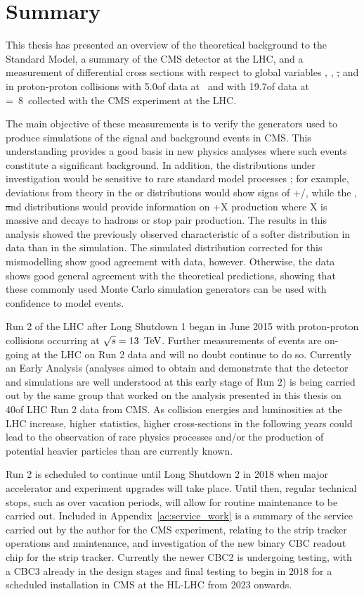 \chapter{Summary }
\label{c:summary}

This thesis has presented an overview of the theoretical background to the Standard Model, a summary of the
CMS detector at the LHC, and a measurement of differential \ttbar cross sections with respect to global
variables \met, \HT, \st, \mt and \wpt in proton-proton collisions with 5.0\fbinv of data at ~\TeV and
with 19.7\fbinv of data at \roots=~8~\TeV collected with the CMS experiment at the LHC. 

The main objective of these measurements is to verify the generators used to produce simulations of the signal
and background events in CMS. This understanding provides a good basis in new physics analyses where such
events constitute a significant background. In addition, the distributions under investigation would be
sensitive to rare standard model processes ; for example, deviations from theory in the \met or \mt
distributions would show signs of \ttbar+\Z/\W, while the \HT, \st and \wpt distributions would provide
information on \ttbar+X production where X is massive and decays to hadrons or stop pair production. The
results in this analysis showed the previously observed characteristic of a softer \pt distribution in data
than in the simulation. The simulated distribution corrected for this mismodelling show good agreement with
data, however. Otherwise, the data shows good general agreement with the theoretical predictions, showing that
these commonly used Monte Carlo simulation generators can be used with confidence to model \ttbar events.

Run 2 of the LHC after Long Shutdown 1 began in June 2015 with proton-proton collisions occurring at
$\sqrt{s}=13~\,\text{Te\hspace{-.08em}V}$. Further measurements of \ttbar events are on-going at the LHC on Run 2 data and will no
doubt continue to do so. Currently an Early Analysis (analyses aimed to obtain and demonstrate that the
detector and simulations are well understood at this early stage of Run 2) is being carried out by the same
group that worked on the analysis presented in this thesis on 40\pbinv of LHC Run 2 data from CMS. As
collision energies and luminosities at the LHC increase, higher statistics, higher cross-sections in the
following years could lead to the observation of rare physics processes and/or the production of potential
heavier particles than are currently known.

Run 2 is scheduled to continue until Long Shutdown 2 in 2018 when major accelerator and experiment upgrades
will take place. Until then, regular technical stops, such as over vacation periods, will allow for routine
maintenance to be carried out. Included in Appendix~\ref{ac:service_work} is a summary of the service carried
out by the author for the CMS experiment, relating to the strip tracker operations and maintenance, and
investigation of the new binary CBC readout chip for the strip tracker. Currently the newer CBC2 is undergoing
testing, with a CBC3 already in the design stages and final testing to begin in 2018 for a scheduled
installation in CMS at the HL-LHC from 2023 onwards.

